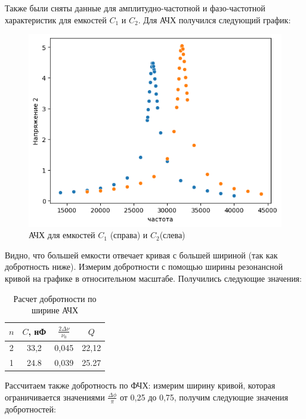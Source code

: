 \documentclass[a4paper, 12pt]{article}
\begin{document}
    Также были сняты данные для амплитудно-частотной и фазо-частотной характеристик для емкостей $C_1$ и $C_2$. Для АЧХ получился следующий график:
	
	\begin{figure}[h]
		\includegraphics[width = \textwidth]{images/image.png}
		\caption{АЧХ для емкостей $C_1$ (справа) и $C_2$(слева)}
	\end{figure}
	
	Видно, что большей емкости отвечает кривая с большей шириной (так как добротность ниже). Измерим добротности с помощью ширины резонансной кривой на графике в относительном масштабе. Получились следующие значения:
	
	\begin{table}[h]
		\centering
		\begin{tabular}{|c|c|c|c|}
			\hline
			$n$ & $C$, нФ & $\frac{2\Delta \nu}{\nu_0}$ & $Q$ \\ \hline
			2 & 33,2 & 0,045 & 22,12 \\ \hline
			1 & 24.8 & 0,039 & 25.27 \\ \hline
		\end{tabular}
		\caption{Расчет добротности по ширине АЧХ}
	\end{table}
	
	Рассчитаем также добротность по ФЧХ: измерим ширину кривой, которая ограничивается значениями $\frac{\Delta \phi}{\pi}$ от 0,25 до 0,75, получим следующие значения добротностей:
	
\end{document}
